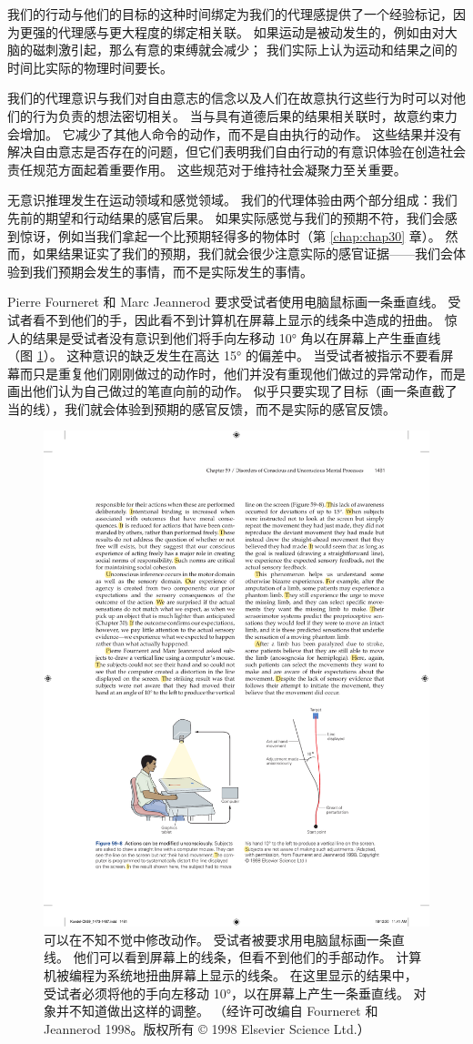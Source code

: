 我们的行动与他们的目标的这种时间绑定为我们的代理感提供了一个经验标记，因为更强的代理感与更大程度的绑定相关联。 如果运动是被动发生的，例如由对大脑的磁刺激引起，那么有意的束缚就会减少； 我们实际上认为运动和结果之间的时间比实际的物理时间要长。

我们的代理意识与我们对自由意志的信念以及人们在故意执行这些行为时可以对他们的行为负责的想法密切相关。 当与具有道德后果的结果相关联时，故意约束力会增加。 它减少了其他人命令的动作，而不是自由执行的动作。 这些结果并没有解决自由意志是否存在的问题，但它们表明我们自由行动的有意识体验在创造社会责任规范方面起着重要作用。 这些规范对于维持社会凝聚力至关重要。

无意识推理发生在运动领域和感觉领域。 我们的代理体验由两个部分组成：我们先前的期望和行动结果的感官后果。 如果实际感觉与我们的预期不符，我们会感到惊讶，例如当我们拿起一个比预期轻得多的物体时（第 \ref{chap:chap30} 章）。 然而，如果结果证实了我们的预期，我们就会很少注意实际的感官证据——我们会体验到我们预期会发生的事情，而不是实际发生的事情。

Pierre Fourneret 和 Marc Jeannerod 要求受试者使用电脑鼠标画一条垂直线。 受试者看不到他们的手，因此看不到计算机在屏幕上显示的线条中造成的扭曲。 惊人的结果是受试者没有意识到他们将手向左移动 10° 角以在屏幕上产生垂直线（图 \ref{fig:59_8}）。 这种意识的缺乏发生在高达 15° 的偏差中。 当受试者被指示不要看屏幕而只是重复他们刚刚做过的动作时，他们并没有重现他们做过的异常动作，而是画出他们认为自己做过的笔直向前的动作。 似乎只要实现了目标（画一条直截了当的线），我们就会体验到预期的感官反馈，而不是实际的感官反馈。

\begin{figure}[htbp]
	\centering
	\includegraphics[width=0.65\linewidth]{chap59/fig_59_8}
	\caption{可以在不知不觉中修改动作。 受试者被要求用电脑鼠标画一条直线。 他们可以看到屏幕上的线条，但看不到他们的手部动作。 计算机被编程为系统地扭曲屏幕上显示的线条。 在这里显示的结果中，受试者必须将他的手向左移动 10°，以在屏幕上产生一条垂直线。 对象并不知道做出这样的调整。 （经许可改编自 Fourneret 和 Jeannerod 1998。版权所有 © 1998 Elsevier Science Ltd.）}
	\label{fig:59_8}
\end{figure}

